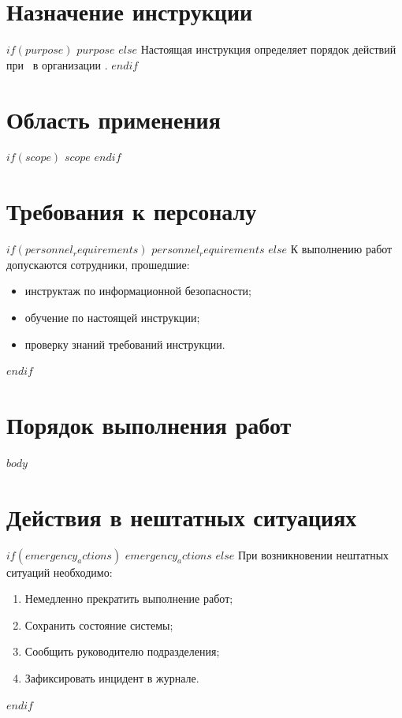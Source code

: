 \documentclass[14pt,a4paper]{extarticle}
\begin{document}
\makeSimpleTitlePage

\mainpagestyle
\tableofcontents
\newpage

\section{Назначение инструкции}
\label{sec:purpose}

$if(purpose)$
$purpose$
$else$
Настоящая инструкция определяет порядок действий при \docTitle\ в организации \docOrganization.
$endif$

\section{Область применения}
\label{sec:scope}

$if(scope)$
$scope$
$endif$

\section{Требования к персоналу}
\label{sec:requirements}

$if(personnel_requirements)$
$personnel_requirements$
$else$
К выполнению работ допускаются сотрудники, прошедшие:
\begin{itemize}
    \item инструктаж по информационной безопасности;
    \item обучение по настоящей инструкции;
    \item проверку знаний требований инструкции.
\end{itemize}
$endif$

\section{Порядок выполнения работ}
\label{sec:procedure}

$body$

\section{Действия в нештатных ситуациях}
\label{sec:emergency}

$if(emergency_actions)$
$emergency_actions$
$else$
При возникновении нештатных ситуаций необходимо:
\begin{enumerate}
    \item Немедленно прекратить выполнение работ;
    \item Сохранить состояние системы;
    \item Сообщить руководителю подразделения;
    \item Зафиксировать инцидент в журнале.
\end{enumerate}
$endif$
\end{document}
